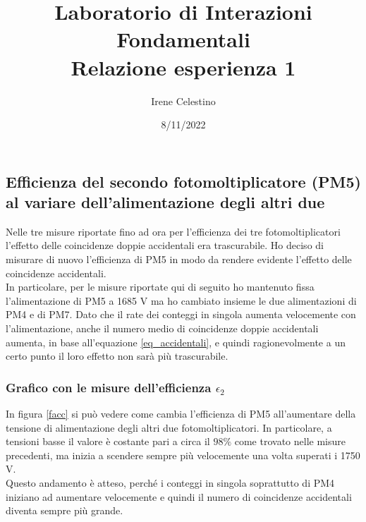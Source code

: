 \documentclass{article}
\title{Laboratorio di Interazioni Fondamentali \\ Relazione esperienza 1}
\author{Irene Celestino}
\date{8/11/2022}
\begin{document}
\maketitle


\subsection{Efficienza del secondo fotomoltiplicatore (PM5) al variare dell'alimentazione degli altri due}
Nelle tre misure riportate fino ad ora per l'efficienza dei tre fotomoltiplicatori l'effetto delle coincidenze doppie accidentali era trascurabile. Ho deciso di misurare di nuovo l'efficienza di PM5 in modo da rendere evidente l'effetto delle coincidenze accidentali.
\\
In particolare, per le misure riportate qui di seguito ho mantenuto fissa l'alimentazione di PM5 a 1685 V ma ho cambiato insieme le due alimentazioni di PM4 e di PM7. Dato che il rate dei conteggi in singola aumenta velocemente con l'alimentazione, anche il numero medio di coincidenze doppie accidentali aumenta, in base all'equazione \ref{eq_accidentali}, e quindi ragionevolmente a un certo punto il loro effetto non sarà più trascurabile. 
\subsubsection{Grafico con le misure dell'efficienza $\epsilon_2$}
In figura \ref{facc} si può vedere come cambia l'efficienza di PM5 all'aumentare della tensione di alimentazione degli altri due fotomoltiplicatori. In particolare, a tensioni basse il valore è costante pari a circa il $98\%$ come trovato nelle misure precedenti, ma inizia a scendere sempre più velocemente una volta superati i 1750 V.
\\
Questo andamento è atteso, perché i conteggi in singola soprattutto di PM4 iniziano ad aumentare velocemente e quindi il numero di coincidenze accidentali diventa sempre più grande. 
\end{document}
